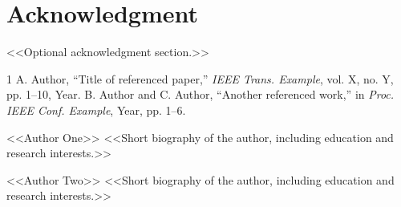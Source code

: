\documentclass[journal]{IEEEtran}
\begin{document}
\section*{Acknowledgment}
<<Optional acknowledgment section.>>

\begin{thebibliography}{1}
 A. Author, ``Title of referenced paper,'' \textit{IEEE Trans. Example}, vol. X, no. Y, pp. 1--10, Year.
 B. Author and C. Author, ``Another referenced work,'' in \textit{Proc. IEEE Conf. Example}, Year, pp. 1--6.
\end{thebibliography}

\begin{IEEEbiography}{<<Author One>>}
<<Short biography of the author, including education and research interests.>>
\end{IEEEbiography}

\begin{IEEEbiography}{<<Author Two>>}
<<Short biography of the author, including education and research interests.>>
\end{IEEEbiography}
\end{document}
